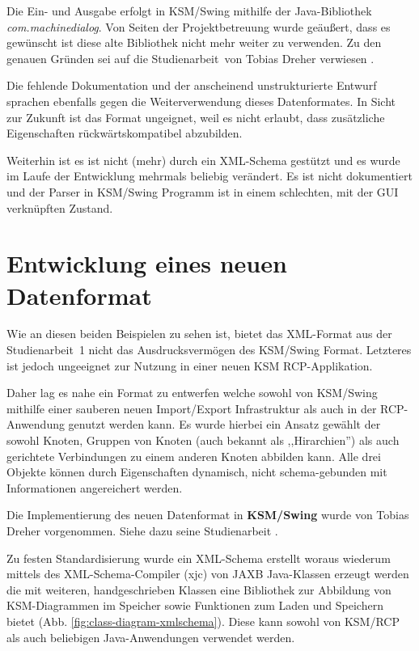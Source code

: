\documentclass[%
12pt,titlepage,abstracton,DIV=10]{scrreprt}
\begin{document}
Die Ein- und Ausgabe erfolgt in KSM/Swing mithilfe der Java-Bibliothek
\textit{com.machinedialog}. Von Seiten der Projektbetreuung wurde geäußert, dass
es gewünscht ist diese alte Bibliothek nicht mehr weiter zu verwenden. Zu den
genauen Gründen sei auf die Studienarbeit\, von Tobias Dreher
verwiesen \cite[S. 24]{dreher10}.

Die fehlende Dokumentation und der anscheinend unstrukturierte Entwurf sprachen
ebenfalls gegen die Weiterverwendung dieses Datenformates.
In Sicht zur Zukunft ist das Format ungeignet, weil es nicht erlaubt, dass
zusätzliche Eigenschaften rückwärtskompatibel abzubilden.

Weiterhin ist es ist nicht (mehr) durch ein XML-Schema gestützt und es wurde im
Laufe der Entwicklung mehrmals beliebig verändert. Es ist nicht dokumentiert und
der Parser in KSM/Swing Programm ist in einem schlechten, mit der GUI
verknüpften Zustand.

\section{Entwicklung eines neuen Datenformat}
Wie an diesen beiden Beispielen zu sehen ist, bietet das XML-Format aus der
Studienarbeit~1 nicht das Ausdrucksvermögen des KSM/Swing Format. Letzteres ist
jedoch ungeeignet zur Nutzung in einer neuen KSM RCP-Applikation.

Daher lag es nahe ein Format zu entwerfen welche sowohl von KSM/Swing mithilfe
einer sauberen neuen Import/Export Infrastruktur als auch in der RCP-Anwendung
genutzt werden kann. Es wurde hierbei ein Ansatz gewählt der sowohl Knoten,
Gruppen von Knoten (auch bekannt als ,,Hirarchien'') als auch gerichtete
Verbindungen zu einem anderen Knoten abbilden kann. Alle drei Objekte können
durch Eigenschaften dynamisch, nicht schema-gebunden mit Informationen
angereichert werden.

\par
\begingroup
\leftskip=1.5cm %
\noindent Die Implementierung des neuen Datenformat in \textbf{KSM/Swing} wurde
von Tobias Dreher vorgenommen. Siehe dazu seine Studienarbeit \cite{dreher11}.
\par
\endgroup


Zu festen Standardisierung wurde ein XML-Schema erstellt woraus wiederum mittels
des XML-Schema-Compiler (xjc) von JAXB Java-Klassen erzeugt werden die mit
weiteren, handgeschrieben Klassen eine Bibliothek zur Abbildung von
KSM-Diagrammen im Speicher sowie Funktionen zum Laden und Speichern bietet (Abb.
\ref{fig:class-diagram-xmlschema}). Diese kann sowohl von KSM/RCP als auch
beliebigen Java-Anwendungen verwendet werden.
\end{document}
